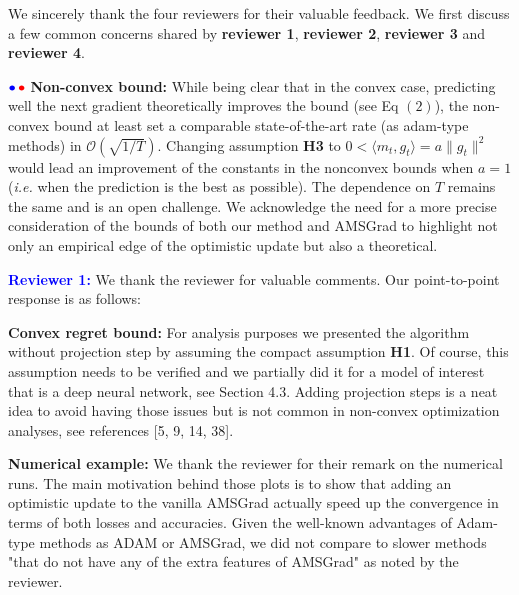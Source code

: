 \documentclass{article}
\begin{document}
We sincerely thank the four reviewers for their valuable feedback. 
We first discuss a few common concerns shared by \textbf{\color{blue}reviewer 1}, \textbf{\color{red} reviewer 2}, \textbf{\color{green!50!black}reviewer 3} and \textbf{\color{purple}reviewer 4}. \vspace{-5pt}



${\color{blue}\bullet}\!~{\color{red}\bullet}$ \textbf{Non-convex bound:} 
While being clear that in the convex case, predicting well the next gradient theoretically improves the bound (see Eq $(2)$), the non-convex bound at least set a comparable state-of-the-art rate (as adam-type methods) in $\mathcal{O}( \sqrt{1/T} )$.
Changing assumption \textbf{H3} to $0 < \langle m_t, g_t \rangle  = a \|g_t\|^2$ would lead an improvement of the constants in the nonconvex bounds when $a=1$ (\textit{i.e.} when the prediction is the best as possible). The dependence on $T$ remains the same and is an open challenge.
We acknowledge the need for a more precise consideration of the bounds of both our method and AMSGrad to highlight not only an empirical edge of the optimistic update but also a theoretical. \vspace{-5pt}


\textbf{\textcolor{blue}{Reviewer 1:}} We thank the reviewer for valuable comments. Our point-to-point response is as follows:\vspace{-5pt}


\textbf{Convex regret bound:} 
For analysis purposes we presented the algorithm without projection step by assuming the compact assumption \textbf{H1}.
Of course, this assumption needs to be verified and we partially did it for a model of interest that is a deep neural network, see Section 4.3.
Adding projection steps is a neat idea to avoid having those issues but is not common in non-convex optimization analyses, see references [5, 9, 14, 38].\vspace{-5pt}

\textbf{Numerical example:} We thank the reviewer for their remark on the numerical runs. 
The main motivation behind those plots is to show that adding an optimistic update to the vanilla AMSGrad actually speed up the convergence in terms of both losses and accuracies.
Given the well-known advantages of Adam-type methods as ADAM or AMSGrad, we did not compare to slower methods "that do not have any of the extra features of AMSGrad" as noted by the reviewer.\vspace{-5pt}
\end{document}
